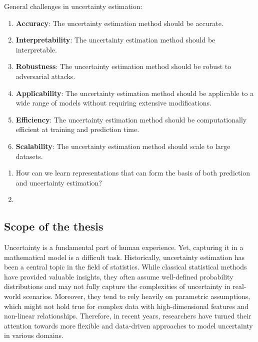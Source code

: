 General challenges in uncertainty estimation:
\begin{enumerate}
    \item \textbf{Accuracy}: The uncertainty estimation method should be accurate.
    \item \textbf{Interpretability}: The uncertainty estimation method should be interpretable.
    \item \textbf{Robustness}: The uncertainty estimation method should be robust to adversarial attacks.
    \item \textbf{Applicability}: The uncertainty estimation method should be applicable to a wide range of models without requiring extensive modifications.
    \item \textbf{Efficiency}: The uncertainty estimation method should be computationally efficient at training and prediction time.
    \item \textbf{Scalability}: The uncertainty estimation method should scale to large datasets.
\end{enumerate}


\begin{enumerate}
    \item How can we learn representations that can form the basis of both prediction and uncertainty estimation?
    \item 
\end{enumerate}



\subsection{Scope of the thesis}




\iffalse




Uncertainty is a fundamental part of human experience. Yet, capturing it in a mathematical model is a difficult task. Historically, uncertainty estimation has been a central topic in the field of statistics. While classical statistical methods have provided valuable insights, they often assume well-defined probability distributions and may not fully capture the complexities of uncertainty in real-world scenarios. Moreover, they tend to rely heavily on parametric assumptions, which might not hold true for complex data with high-dimensional features and non-linear relationships. Therefore, in recent years, researchers have turned their attention towards more flexible and data-driven approaches to model uncertainty in various domains.

